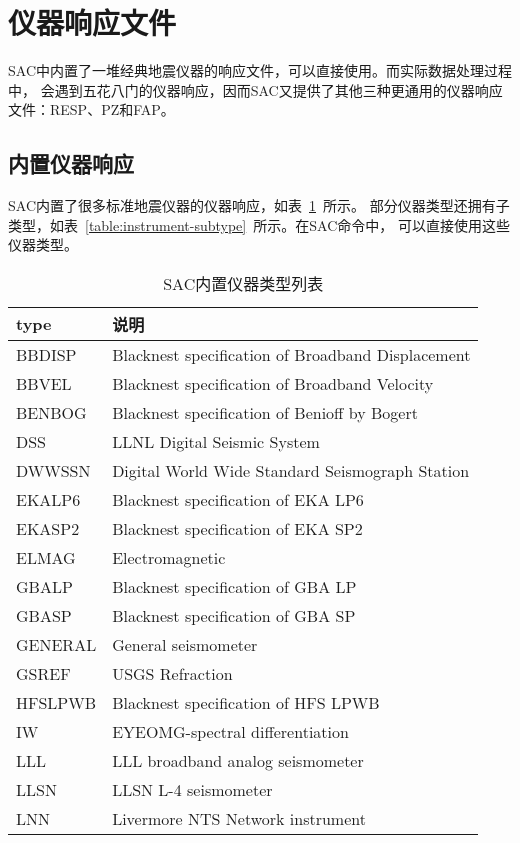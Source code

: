 \section{仪器响应文件}
SAC中内置了一堆经典地震仪器的响应文件，可以直接使用。而实际数据处理过程中，
会遇到五花八门的仪器响应，因而SAC又提供了其他三种更通用的仪器响应文件：RESP、PZ和FAP。

\subsection{内置仪器响应}
SAC内置了很多标准地震仪器的仪器响应，如表~\ref{table:instrument-type}~所示。
部分仪器类型还拥有子类型，如表~\ref{table:instrument-subtype}~所示。在SAC命令中，
可以直接使用这些仪器类型。

\begin{table}[tp]
\centering
\ttfamily
\small
\caption{SAC内置仪器类型列表}
\label{table:instrument-type}
\begin{tabular}{ll}
\toprule
type     &  说明  \\
\midrule
BBDISP   &  Blacknest specification of Broadband Displacement \\
BBVEL    &  Blacknest specification of Broadband Velocity   \\
BENBOG   &  Blacknest specification of Benioff by Bogert    \\
DSS      &  LLNL Digital Seismic System \\
DWWSSN   &  Digital World Wide Standard Seismograph Station \\
EKALP6   &  Blacknest specification of EKA LP6  \\
EKASP2   &  Blacknest specification of EKA SP2  \\
ELMAG    &  Electromagnetic \\
GBALP    &  Blacknest specification of GBA LP   \\
GBASP    &  Blacknest specification of GBA SP   \\
GENERAL  &  General seismometer \\
GSREF    &  USGS Refraction \\
HFSLPWB  &  Blacknest specification of HFS LPWB \\
IW       &  EYEOMG-spectral differentiation \\
LLL      &  LLL broadband analog seismometer    \\
LLSN     &  LLSN L-4 seismometer    \\
LNN      &  Livermore NTS Network instrument    \\

\end{tabular}
\end{table}
